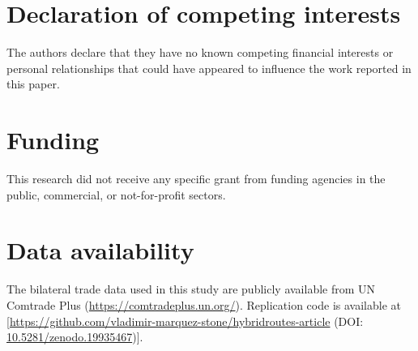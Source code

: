 \documentclass[11pt]{article}
\begin{document}
\section*{Declaration of competing interests}
The authors declare that they have no known competing financial interests
or personal relationships that could have appeared to influence the work
reported in this paper.

\section*{Funding}
This research did not receive any specific grant from funding agencies
in the public, commercial, or not-for-profit sectors.

\section*{Data availability}
The bilateral trade data used in this study are publicly available from
UN Comtrade Plus (\url{https://comtradeplus.un.org/}). Replication code
is available at [\url{https://github.com/vladimir-marquez-stone/hybridroutes-article} (DOI: \url{10.5281/zenodo.19935467})].



\end{document}
